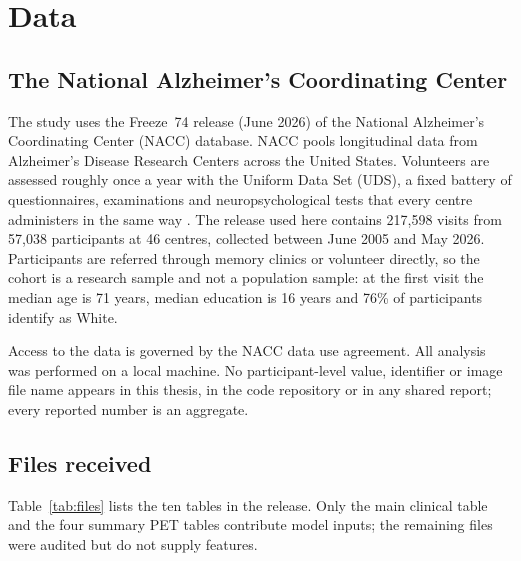 \chapter{Data}
\label{ch:data}

\section{The National Alzheimer's Coordinating Center}

The study uses the Freeze~74 release (June 2026) of the National Alzheimer's Coordinating Center (NACC) database. NACC pools longitudinal data from Alzheimer's Disease Research Centers across the United States. Volunteers are assessed roughly once a year with the Uniform Data Set (UDS), a fixed battery of questionnaires, examinations and neuropsychological tests that every centre administers in the same way \cite{weintraub2018}. The release used here contains 217,598 visits from 57,038 participants at 46 centres, collected between June 2005 and May 2026. Participants are referred through memory clinics or volunteer directly, so the cohort is a research sample and not a population sample: at the first visit the median age is 71 years, median education is 16 years and 76\% of participants identify as White.

Access to the data is governed by the NACC data use agreement. All analysis was performed on a local machine. No participant-level value, identifier or image file name appears in this thesis, in the code repository or in any shared report; every reported number is an aggregate.

\section{Files received}

Table~\ref{tab:files} lists the ten tables in the release. Only the main clinical table and the four summary PET tables contribute model inputs; the remaining files were audited but do not supply features.

